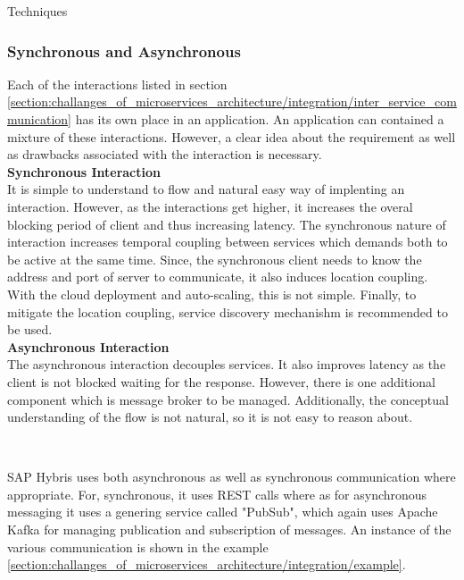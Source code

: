 \begin{shaded}Techniques\end{shaded}
\subsubsection{Synchronous and Asynchronous}\label{section:challanges_of_microservices_architecture/integration/synchronous_and_asynchronous}
Each of the interactions listed in section \ref{section:challanges_of_microservices_architecture/integration/inter_service_communication} has its own place in an application. An application can contained a mixture of these interactions. However, a clear idea about the requirement as well as drawbacks associated with the interaction is necessary.\cite{Newman:2015aa}\cite{Richardson:2014aa}\cite{Morris:2015aa}\\
\textbf{Synchronous Interaction}
\\
It is simple to understand to flow and natural easy way of implenting an interaction. However, as the interactions get higher, it increases the overal blocking period of client and thus increasing latency. The synchronous nature of interaction increases temporal coupling between services which demands both to be active at the same time. Since, the synchronous client needs to know the address and port of server to communicate, it also induces location coupling. With the cloud deployment and auto-scaling, this is not simple. Finally, to mitigate the location coupling, service discovery mechanishm is recommended to be used.
\\
  
\textbf{Asynchronous Interaction}
\\
The asynchronous interaction decouples services. It also improves latency as the client is not blocked waiting for the response. However, there is one additional component which is message broker to be managed. Additionally, the conceptual understanding of the flow is not natural, so it is not easy to reason about.

\\
\begin{shaded}
SAP Hybris uses both asynchronous as well as synchronous communication where appropriate. For, synchronous, it uses \acrshort{REST} calls where as for asynchronous messaging it uses a genering service called "PubSub", which again uses Apache Kafka for managing publication and subscription of messages. An instance of the various communication is shown in the example \ref{section:challanges_of_microservices_architecture/integration/example}. 
\end{shaded}
